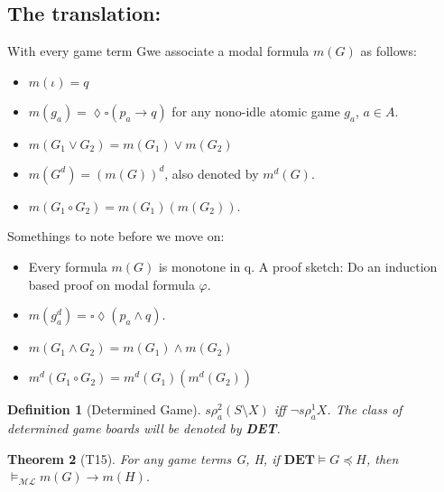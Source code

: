 \documentclass[10pt]{article}
\renewcommand{\phi}{\varphi}
\newcommand{\move}{\lozenge}
\newcommand{\Move}{\square}
\newcommand{\ml}{\mathcal{ML}}
\newcommand{\id}{\iota}
\newcommand{\cle}{\preccurlyeq}
\newtheorem{theorem}{Theorem}
\newtheorem{definition}[theorem]{Definition}
\begin{document}
		\subsection{The translation:}
		With every game term Gwe associate a modal formula $m(G)$ as follows:
		\begin{itemize}
			\item $m(\id) = q$
			\item $m(g_a) = \move\Move(p_a \rightarrow q)$ for any nono-idle atomic game $g_a$, $a\in A$. 
			\item $m(G_1 \lor G_2) = m(G_1)\lor m(G_2)$
			\item $m(G^d) = (m(G))^d$, also denoted by $m^d(G)$.
			\item $m(G_1 \circ G_2) = m(G_1)(m(G_2))$. 
		\end{itemize}
		Somethings to note before we move on:
		\begin{itemize}
			\item Every formula $m(G)$ is  monotone in q. A proof sketch: Do an induction based proof on modal formula $\phi$.
			\item $m(g_a^d) = \Move\move(p_a \land q)$.
			\item $m(G_1 \land G_2) = m(G_1) \land m(G_2)$
			\item $m^d(G_1 \circ G_2) = m^d(G_1)(m^d(G_2))$
		\end{itemize}
		\begin{definition}[Determined Game]
			$s\rho_a^2(S\setminus X)$ iff $\neg s \rho_a^1 X$. The class of determined
			game boards will be denoted by \textbf{DET}.
		\end{definition}
		\begin{theorem}[T15]\label{eq23}
			For any game terms G, H, if $\textbf{DET}\models G \cle H$, then $\models_{\ml} m(G) \rightarrow m(H)$.
		\end{theorem}
\end{document}
